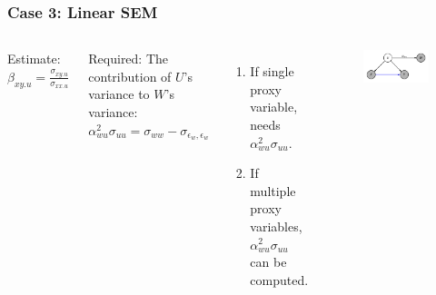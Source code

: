 \documentclass{beamer}
\begin{document}
\begin{frame}
\frametitle{Case 3: Linear SEM}

\begin{columns}
	Estimate: $ \beta_{xy.u} = \frac{\sigma_{xy.u}}{\sigma_{xx.u}} $

	\bigskip

	Required: The contribution of $U$'s variance to $W$'s variance: $ \alpha_{wu}^2 \sigma_{uu} = \sigma_{ww} - \sigma_{\epsilon_w, \epsilon_w} $

	\bigskip

	\begin{enumerate}
		\item If single proxy variable, needs $ \alpha_{wu}^2 \sigma_{uu} $.
		\item If multiple proxy variables, $ \alpha_{wu}^2 \sigma_{uu} $ can be computed.
	\end{enumerate}

	\begin{figure}
    		\centering
    		\includegraphics[scale=0.6]{scripts/sem.png}
	\end{figure}
\end{columns}

\end{frame}
\end{document}
